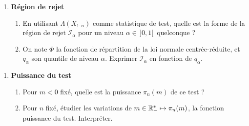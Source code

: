 \documentclass[french,11pt]{article}
\begin{document}
\begin{enumerate}[resume]
	\item \textbf{Région de rejet}
	\begin{enumerate}
		\item En utilisant $\Lambda(X_{1:n})$ comme statistique de test, quelle est la forme de la région de rejet $\mathcal{I}_\alpha$ pour un niveau $\alpha \in \,]0,1[\,$ quelconque ? 
		\item On note $\Phi$ la fonction de répartition de la loi normale centrée-réduite, et $q_\alpha$ son quantile de niveau $\alpha$. Exprimer $\mathcal{I}_\alpha$ en fonction de $q_\alpha$.
	\end{enumerate}
\end{enumerate}

\begin{enumerate}[resume]
	\item \textbf{Puissance du test}
	\begin{enumerate}
		\item Pour $m < 0$ fixé, quelle est la puissance $\pi_n(m)$ de ce test ?
		\item Pour $n$ fixé, étudier les variations de $m \in \mathbb{R}_-^\ast \mapsto \pi_n(m)$, la fonction puissance du test. Interpréter.
	\end{enumerate}
\end{enumerate}
\end{document}
